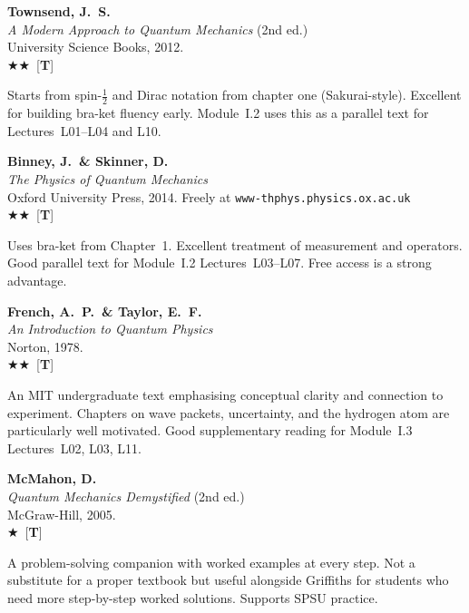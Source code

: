 \documentclass[11pt,a4paper]{article}
\newcommand{\recommended}{$\bigstar\bigstar$}
\newcommand{\useful}{$\bigstar$}
\newenvironment{bibentry}[1]{\begin{tcolorbox}[entrybox=#1,top=4pt,bottom=4pt]}{\end{tcolorbox}\smallskip}
\begin{document}
\begin{bibentry}{t2light}
\textbf{Townsend, J.~S.}\\
\textit{A Modern Approach to Quantum Mechanics} (2nd ed.)\\
University Science Books, 2012.\\[3pt]
\recommended\ [\textbf{T}]\\[3pt]
\begin{tcolorbox}[annotbox]
Starts from spin-$\tfrac{1}{2}$ and Dirac notation from chapter one (Sakurai-style).
Excellent for building bra-ket fluency early. Module~I.2 uses this as a parallel
text for Lectures~L01--L04 and L10.
\end{tcolorbox}
\end{bibentry}

\begin{bibentry}{t2light}
\textbf{Binney, J.\ \& Skinner, D.}\\
\textit{The Physics of Quantum Mechanics}\\
Oxford University Press, 2014. Freely at \texttt{www-thphys.physics.ox.ac.uk}\\[3pt]
\recommended\ [\textbf{T}]\\[3pt]
\begin{tcolorbox}[annotbox]
Uses bra-ket from Chapter~1. Excellent treatment of measurement and operators.
Good parallel text for Module~I.2 Lectures~L03--L07. Free access is a strong advantage.
\end{tcolorbox}
\end{bibentry}

\begin{bibentry}{t2light}
\textbf{French, A.~P.\ \& Taylor, E.~F.}\\
\textit{An Introduction to Quantum Physics}\\
Norton, 1978.\\[3pt]
\recommended\ [\textbf{T}]\\[3pt]
\begin{tcolorbox}[annotbox]
An MIT undergraduate text emphasising conceptual clarity and connection to experiment.
Chapters on wave packets, uncertainty, and the hydrogen atom are particularly well
motivated. Good supplementary reading for Module~I.3 Lectures~L02, L03, L11.
\end{tcolorbox}
\end{bibentry}

\begin{bibentry}{t2light}
\textbf{McMahon, D.}\\
\textit{Quantum Mechanics Demystified} (2nd ed.)\\
McGraw-Hill, 2005.\\[3pt]
\useful\ [\textbf{T}]\\[3pt]
\begin{tcolorbox}[annotbox]
A problem-solving companion with worked examples at every step. Not a substitute for
a proper textbook but useful alongside Griffiths for students who need more
step-by-step worked solutions. Supports SPSU practice.
\end{tcolorbox}
\end{bibentry}
\end{document}
